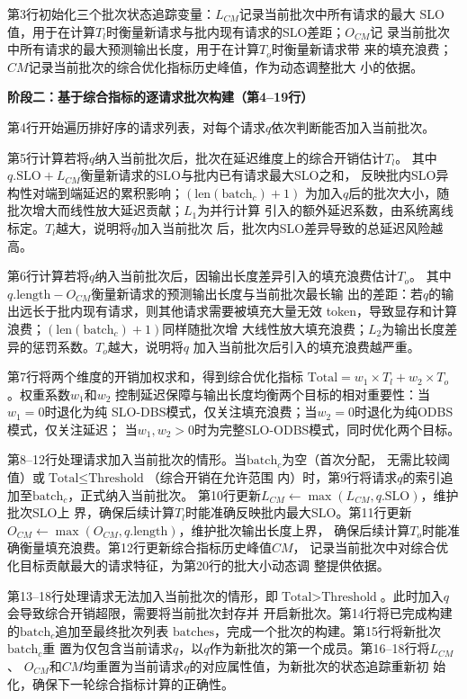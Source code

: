 第3行初始化三个批次状态追踪变量：$L_{CM}$记录当前批次中所有请求的最大
SLO值，用于在计算$T_l$时衡量新请求与批内现有请求的SLO差距；$O_{CM}$记
录当前批次中所有请求的最大预测输出长度，用于在计算$T_o$时衡量新请求带
来的填充浪费；$CM$记录当前批次的综合优化指标历史峰值，作为动态调整批大
小的依据。


\textbf{阶段二：基于综合指标的逐请求批次构建（第4--19行）}

第4行开始遍历排好序的请求列表，对每个请求$q$依次判断能否加入当前批次。

第5行计算若将$q$纳入当前批次后，批次在延迟维度上的综合开销估计$T_l$。
其中$q.\text{SLO} + L_{CM}$衡量新请求的SLO与批内已有请求最大SLO之和，
反映批内SLO异构性对端到端延迟的累积影响；$(\text{len}(\text{batch}_c)+1)$
为加入$q$后的批次大小，随批次增大而线性放大延迟贡献；$L_1$为并行计算
引入的额外延迟系数，由系统离线标定。$T_l$越大，说明将$q$加入当前批次
后，批次内SLO差异导致的总延迟风险越高。


第6行计算若将$q$纳入当前批次后，因输出长度差异引入的填充浪费估计$T_o$。
其中$q.\text{length} - O_{CM}$衡量新请求的预测输出长度与当前批次最长输
出的差距：若$q$的输出远长于批内现有请求，则其他请求需要被填充大量无效
token，导致显存和计算浪费；$(\text{len}(\text{batch}_c)+1)$同样随批次增
大线性放大填充浪费；$L_2$为输出长度差异的惩罚系数。$T_o$越大，说明将$q$
加入当前批次后引入的填充浪费越严重。

第7行将两个维度的开销加权求和，得到综合优化指标
$\text{Total} = w_1 \times T_l + w_2 \times T_o$。权重系数$w_1$和$w_2$
控制延迟保障与输出长度均衡两个目标的相对重要性：当$w_1=0$时退化为纯
SLO-DBS模式，仅关注填充浪费；当$w_2=0$时退化为纯ODBS模式，仅关注延迟；
当$w_1,w_2>0$时为完整SLO-ODBS模式，同时优化两个目标。

第8--12行处理请求加入当前批次的情形。当$\text{batch}_c$为空（首次分配，
无需比较阈值）或$\text{Total} \leq \text{Threshold}$（综合开销在允许范围
内）时，第9行将请求$q$的索引追加至$\text{batch}_c$，正式纳入当前批次。
第10行更新$L_{CM} \leftarrow \max(L_{CM}, q.\text{SLO})$，维护批次SLO上
界，确保后续计算$T_l$时能准确反映批内最大SLO。第11行更新
$O_{CM} \leftarrow \max(O_{CM}, q.\text{length})$，维护批次输出长度上界，
确保后续计算$T_o$时能准确衡量填充浪费。第12行更新综合指标历史峰值$CM$，
记录当前批次中对综合优化目标贡献最大的请求特征，为第20行的批大小动态调
整提供依据。

第13--18行处理请求无法加入当前批次的情形，即$\text{Total} >
\text{Threshold}$。此时加入$q$会导致综合开销超限，需要将当前批次封存并
开启新批次。第14行将已完成构建的$\text{batch}_c$追加至最终批次列表
$\text{batches}$，完成一个批次的构建。第15行将新批次$\text{batch}_c$重
置为仅包含当前请求$q$，以$q$作为新批次的第一个成员。第16--18行将$L_{CM}$、
$O_{CM}$和$CM$均重置为当前请求$q$的对应属性值，为新批次的状态追踪重新初
始化，确保下一轮综合指标计算的正确性。

